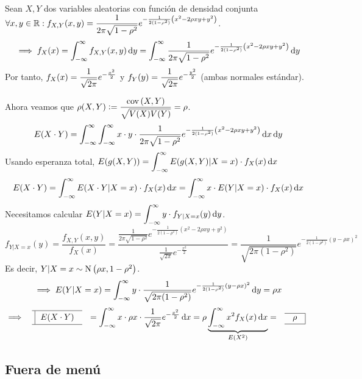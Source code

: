 \begin{ejem}
	Sean $X, Y$ dos variables aleatorias con función de densidad conjunta $\displaystyle \forall x, y \in \mathbb{R} : f_{X, Y}(x, y) = \frac{1}{2\pi \sqrt{1-\rho^2}} e^{-\frac{1}{2(1-\rho^2)}\left(x^2 - 2\rho x y + y^2\right)}$.
	\[\implies f_X(x) = \int_{-\infty}^{\infty} f_{X, Y}(x, y) \odif{y} = \int_{-\infty}^{\infty} \frac{1}{2\pi \sqrt{1-\rho^2}} e^{-\frac{1}{2(1-\rho^2)}\left(x^2 - 2\rho x y + y^2\right)} \odif{y}\]
	Por tanto, $\displaystyle f_X(x) = \frac{1}{\sqrt{2\pi}} e^{-\frac{x^2}{2}}$ y $\displaystyle f_Y(y) = \frac{1}{\sqrt{2\pi}} e^{-\frac{y^2}{2}}$ (ambas normales estándar).

	Ahora veamos que $\displaystyle \rho(X, Y) \vcentcolon= \frac{\operatorname{cov}\left(X, Y\right)}{\sqrt{V(X) V(Y)}} = \rho$.
	\[E(X\cdot Y) = \int_{-\infty}^{\infty} \int_{-\infty}^{\infty} x\cdot y \cdot \frac{1}{2\pi \sqrt{1-\rho^2}} e^{-\frac{1}{2(1-\rho^2)}\left(x^2 - 2\rho x y + y^2\right)} \odif{x} \odif{y}\] %
	Usando esperanza total, $\ds E(g(X, Y)) = \int_{-\infty}^{\infty} E(g(X, Y) \vert X = x) \cdot f_X(x) \odif{x}$
	\[E(X\cdot Y) = \int_{-\infty}^{\infty} E(X\cdot Y \vert X = x) \cdot f_X(x) \odif{x} = \int_{-\infty}^{\infty} x \cdot E(Y \vert X = x) \cdot f_X(x) \odif{x}\]
	Necesitamos calcular $\ds E(Y \vert X = x) = \int_{-\infty}^{\infty} y \cdot f_{Y|X=x}(y) \odif{y}$.
	\[f_{Y|X=x}(y) = \frac{f_{X, Y}(x, y)}{f_X(x)} = \frac{\frac{1}{2\pi \sqrt{1-\rho^2}} e^{-\frac{1}{2(1-\rho^2)}\left(x^2 - 2\rho x y + y^2\right)}}{\frac{1}{\sqrt{2\pi}} e^{-\frac{x^2}{2}}} = \frac{1}{\sqrt{2\pi(1-\rho^2)}} e^{-\frac{1}{2(1-\rho^2)}\left(y-\rho x\right)^2}\]
	Es decir, $Y \vert X = x \sim \operatorname{N}\left(\rho x, 1-\rho^2\right)$.
	\[\implies E(Y \vert X = x) = \int_{-\infty}^{\infty} y \cdot \frac{1}{\sqrt{2\pi(1-\rho^2)}} e^{-\frac{1}{2(1-\rho^2)}\left(y-\rho x\right)^2} \odif{y} = \rho x\]
	\[\implies \lbox{E(X\cdot Y)} = \int_{-\infty}^{\infty} x \cdot \rho x \cdot \frac{1}{\sqrt{2\pi}} e^{-\frac{x^2}{2}} \odif{x} = \rho \underbrace{\int_{-\infty}^{\infty} x^2 f_X(x) \odif{x}}_{E\left(X^2\right)} = \rbox{\rho}\]
\end{ejem}


\subsection{Fuera de menú}

